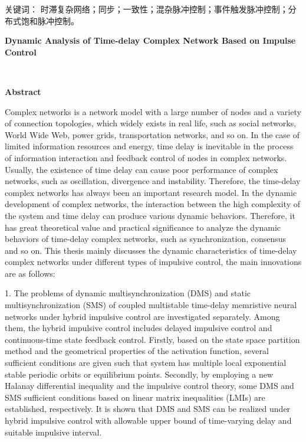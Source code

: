 \vskip 4pt
{\heiti  关键词：} 时滞复杂网络；同步；一致性；混杂脉冲控制；事件触发脉冲控制；分布式饱和脉冲控制。


\newpage
\setcounter{page}{3}
\begin{center}
 {\LARGE\bf Dynamic Analysis of Time-delay Complex Network Based on Impulse Control}
 \end{center}　
\begin{center}
{\LARGE\bf Abstract}
\end{center}
\setcounter{equation}{0}

Complex networks is a network model with a large number of nodes and a variety of connection topologies, which widely exists in real life, such as social networks, World Wide Web, power grids, transportation networks, and so on. In the case of limited information resources and energy,  time delay is inevitable in the process of information interaction and feedback control of nodes in complex networks. Usually,  the existence of time delay can cause  poor performance of complex networks, such as oscillation, divergence and instability. 
Therefore, the time-delay complex networks has always been an important research model. In the dynamic development of complex networks, the interaction between the high complexity of the system and  time delay can produce various dynamic behaviors. Therefore, it has great theoretical value and practical significance  to analyze the dynamic behaviors  of time-delay complex networks, such as synchronization, consensus and so on. This thesis mainly discusses the dynamic characteristics of time-delay complex networks under different types of impulsive control, the main innovations are as follows:
 
1. The problems of dynamic multisynchronization (DMS) and static multisynchronization (SMS) of coupled multistable  time-delay memristive neural networks under hybrid impulsive control are investigated separately. Among them, the hybrid impulsive control includes delayed impulsive control and continuous-time state feedback control. Firstly, based on the state space partition method and the geometrical properties of the activation function,  several sufficient conditions are given   such that system has multiple local  exponential  stable periodic orbits or equilibrium points.  Secondly, by employing a new Halanay differential inequality and the impulsive control theory, some DMS and SMS sufficient conditions based on linear matrix inequalities (LMIs) are established, respectively. It is shown that  DMS and SMS can be realized under hybrid impulsive control with  allowable upper bound of  time-varying delay and suitable impulsive interval.  
 
